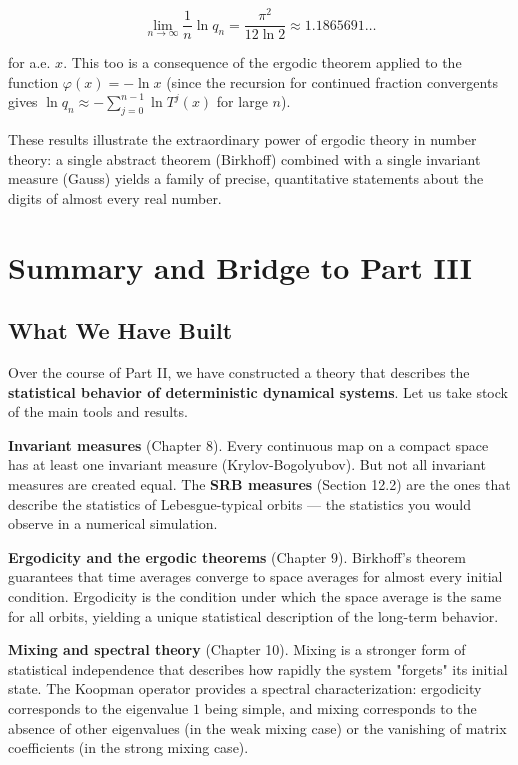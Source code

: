 \begin{theorem}
\[
\lim_{n \to \infty} \frac{1}{n} \ln q_n = \frac{\pi^2}{12 \ln 2} \approx 1.1865691\ldots
\]

for a.e. $x$. This too is a consequence of the ergodic theorem applied to the function $\varphi(x) = -\ln x$ (since the recursion for continued fraction convergents gives $\ln q_n \approx -\sum_{j=0}^{n-1} \ln T^j(x)$ for large $n$).

These results illustrate the extraordinary power of ergodic theory in number theory: a single abstract theorem (Birkhoff) combined with a single invariant measure (Gauss) yields a family of precise, quantitative statements about the digits of almost every real number.
\end{theorem}


\section{Summary and Bridge to Part III}\label{sec:12.6}

\subsection{What We Have Built}\label{sec:12.6.1}

Over the course of Part II, we have constructed a theory that describes the \textbf{statistical behavior of deterministic dynamical systems}. Let us take stock of the main tools and results.

\textbf{Invariant measures} (Chapter 8). Every continuous map on a compact space has at least one invariant measure (Krylov-Bogolyubov). But not all invariant measures are created equal. The \textbf{SRB measures} (Section 12.2) are the ones that describe the statistics of Lebesgue-typical orbits --- the statistics you would observe in a numerical simulation.

\textbf{Ergodicity and the ergodic theorems} (Chapter 9). Birkhoff's theorem guarantees that time averages converge to space averages for almost every initial condition. Ergodicity is the condition under which the space average is the same for all orbits, yielding a unique statistical description of the long-term behavior.

\textbf{Mixing and spectral theory} (Chapter 10). Mixing is a stronger form of statistical independence that describes how rapidly the system "forgets" its initial state. The Koopman operator provides a spectral characterization: ergodicity corresponds to the eigenvalue $1$ being simple, and mixing corresponds to the absence of other eigenvalues (in the weak mixing case) or the vanishing of matrix coefficients (in the strong mixing case).

